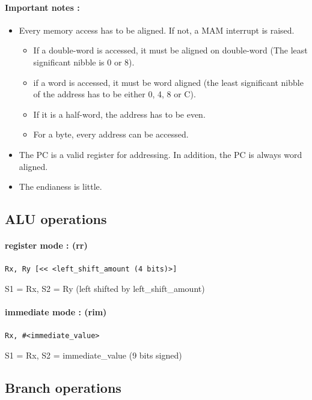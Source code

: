 \documentclass[11pt]{article}
\begin{document}
\paragraph{Important notes : }
\begin{itemize}
    \item Every memory access has to be aligned. If not, a MAM interrupt is raised. 
        \begin{itemize}
            \item If a double-word is accessed, it must be aligned on double-word
                (The least significant nibble is 0 or 8). 
             \item if a word is accessed, it must be word aligned (the least significant nibble of
                the address has to be either 0, 4, 8 or C). 
            \item If it is a half-word, the address has to be even.
            \item For a byte, every address can be accessed. 
        \end{itemize}

    \item The PC is a valid register for addressing. In addition, the PC is always word 
        aligned. 

    \item The endianess is little. 
\end{itemize}

\subsection{ALU operations}

\paragraph{register mode : (rr)}
\texttt{Rx, Ry [<< <left\_shift\_amount (4 bits)>]}

S1 = Rx, S2 = Ry (left shifted by left\_shift\_amount)

\paragraph{immediate mode : (rim)}
\texttt{Rx, \#<immediate\_value>}

S1 = Rx, S2 = immediate\_value (9 bits signed)

\subsection{Branch operations}
\end{document}
